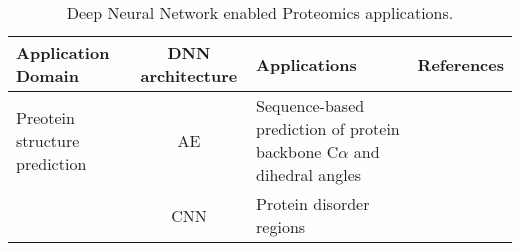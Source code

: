 \begin{table}[h!]
\centering
\begin{tabular}{|| l | c | l | l ||}
    \hline
    Application Domain & DNN architecture & Applications & References\\
    \hline \hline
    Preotein structure prediction & AE & Sequence-based prediction of protein backbone C$\alpha$ and dihedral angles & \\
    & CNN & Protein disorder regions\\
    \hline
\end{tabular}
\caption{Deep Neural Network enabled Proteomics applications.}
\label{tab:PS-DNN}
\end{table}